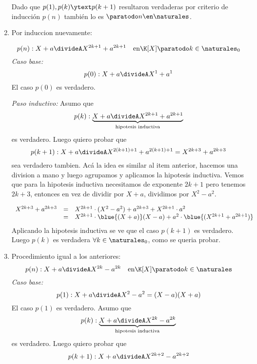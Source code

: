 \begin{enumerate}[label=\roman*)]
        \medskip

        Dado que $p(1), p(k) \ytext p(k+1)$ resultaron verdaderas por criterio de inducción $p(n)$ también lo es $\paratodo n \en \naturales$.

  \item Por induccion nuevamente:
  
          $$
           p(n): X + a \divideA X^{2k + 1} + a^{2k + 1} \quad \text{en} \K[X] \paratodo k \in \naturales_0
          $$
          \textit{Caso base:}
          $$
           p(0) : X + a \divideA X^1 + a^1
          $$
          El caso $p(0)$ es verdadero. 

          \textit{Paso inductivo: } 
          Asumo que
          $$
           p(k) : \underbrace{X + a \divideA X^{2k + 1} + a^{2k + 1}}_{\text{hipotesis inductiva}}
          $$
          es verdadero. Luego quiero probar que 
          $$
           p(k + 1) : X + a \divideA X^{2(k+1) + 1} + a^{2(k+1) + 1} = X^{2k + 3} + a^{2k + 3}
          $$
          sea verdadero tambien.
          Acá la idea es similar al item anterior, hacemos una division a mano y luego agrupamos y aplicamos la 
          hipotesis inductiva. Vemos que para la hipotesis inductiva necesitamos de exponente $2k + 1$ pero tenemos
          $2k + 3$, entonces en vez de dividir por $X + a$, dividimos por $X^2 - a^2$. 
          
          $$
          \begin{array}{rcl}
            X^{2k + 3} + a^{2k + 3} & = & X^{2k + 1}\cdot(X^2 - a^2) + a^{2k+3} + X^{2k + 1}\cdot a^2 \\
                                    & = & X^{2k + 1}\cdot\blue{(X + a)}(X - a) + a^2 \cdot \blue{(X^{2k + 1} + a^{2k + 1})}
          \end{array}
          $$
          Aplicando la hipotesis inductiva se ve que el caso $p(k+1)$ es verdadero. Luego 
          $p(k)$ es verdadera $\forall k \in \naturales_0$, como se queria probar.
           
      
          

  \item Procedimiento igual a los anteriores:
          $$
           p(n) : X + a \divideA X^{2k} - a^{2k} \quad \text{en} \K[X] \paratodo k \in \naturales
          $$
          \textit{Caso base:}
          $$
           p(1) : X + a \divideA X^2 - a^2 = (X - a)(X + a)
          $$
          El caso $p(1)$ es verdadero.
          Asumo que
          $$
           p(k) : \underbrace{X + a \divideA X^{2k} - a^{2k}}_{\text{hipotesis inductiva}}
          $$
          es verdadero. Luego quiero probar que 
          $$
           p(k + 1) : X + a \divideA X^{2k + 2} - a^{2k + 2}
          $$
          

\end{enumerate}
